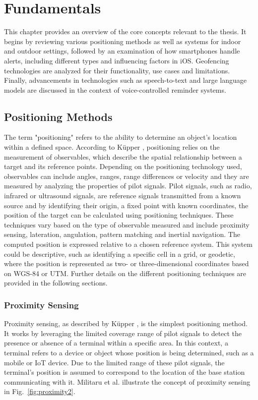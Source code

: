 \chapter{Fundamentals}
\label{cha:Fundamentals}

This chapter provides an overview of the core concepts relevant to the thesis. It begins by reviewing various positioning methods as well as systems for indoor and outdoor settings, followed by an examination of how smartphones handle alerts, including different types and influencing factors in iOS. Geofencing technologies are analyzed for their functionality, use cases and limitations. Finally, advancements in technologies such as speech-to-text and large language models are discussed in the context of voice-controlled reminder systems.

\section{Positioning Methods}
\label{sec:methods}
The term "positioning" refers to the ability to determine an object's location within a defined space. According to K\"upper \cite{kupper2005location}, positioning relies on the measurement of observables, which describe the spatial relationship between a target and its reference points. Depending on the positioning technology used, observables can include angles, ranges, range differences or velocity and they are measured by analyzing the properties of pilot signals. 
Pilot signals, such as radio, infrared or ultrasound signals, are reference signals transmitted from a known source and by identifying their origin, a fixed point with known coordinates, the position of the target can be calculated using positioning techniques. These techniques vary based on the type of observable measured and include proximity sensing, lateration, angulation, pattern matching and inertial navigation.
The computed position is expressed relative to a chosen reference system. This system could be descriptive, such as identifying a specific cell in a grid, or geodetic, where the position is represented as two- or three-dimensional coordinates based on WGS-84 or UTM. Further details on the different positioning techniques are provided in the following sections.

\subsection{Proximity Sensing}
Proximity sensing, as described by K\"upper \cite{kupper2005location}, is the simplest positioning method.
It works by leveraging the limited coverage range of pilot signals to detect the presence or absence of a terminal within a specific area. 
In this context, a terminal refers to a device or object whose position is being determined, such as a mobile or IoT device.
Due to the limited range of these pilot signals, the terminal's position is assumed to correspond to the location of the base station communicating with it.
Militaru et al. \cite{militaru2024positioning} illustrate the concept of proximity sensing in Fig.~\ref{fig:proximity2}.

